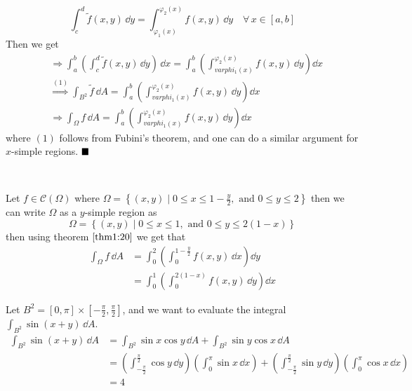 \documentclass[Analysis-3]{subfiles}
\begin{document}
\[
    \int_c^d \tilde{f}(x,y) \, \dd y = \int_{\varphi_1(x)}^{\varphi_2(x)} f(x,y) \, \dd y \quad \forall \, x \in [a,b]    
\]
Then we get 
\begin{align*}
    &\Longrightarrow \int_a^b \left( \int_c^d \tilde{f}(x,y) \, \dd y\right)\, \dd x = \int_a^b \left( \int_{varphi_1(x)}^{\varphi_2(x)} f(x,y) \, \dd y\right) \dd x \\ 
    &\overset{(1)}{\Longrightarrow} \int_{B^2} \tilde{f} \, \dd A = \int_a^b \left( \int_{varphi_1(x)}^{\varphi_2(x)} f(x,y) \, \dd y\right) \dd x \\ 
    &\Longrightarrow \int_{\Omega} f \, \dd A = \int_a^b \left( \int_{varphi_1(x)}^{\varphi_2(x)} f(x,y) \, \dd y\right) \dd x
\end{align*}
where $(1)$ follows from Fubini's theorem, and one can do a similar argument for $x$-simple regions. $\hfill \blacksquare$

\

\begin{Eg}{}{}
    Let $f \in \mathscr{C}(\Omega)$ where $\Omega = \left\{ (x,y) \mid 0 \leq x \leq 1 - \frac{y}{2}, \mbox{ and } 0 \leq y \leq 2 \right\}$ then we can write $\Omega$ as a $y$-simple region as 
    \[
        \Omega = \left\{ (x,y) \mid 0 \leq x \leq 1, \mbox{ and } 0 \leq y \leq 2(1-x) \right\}    
    \]
    then using theorem $\ref{thm1:20}$ we get that 
    \begin{align*}
        \int_{\Omega} f \, \dd A &= \int_0^2 \left( \int_0^{1-\frac{y}{2}} f(x,y) \, \dd x\right) \dd y \\ 
        &= \int_0^1 \left( \int_0^{2(1-x)} f(x,y) \, \dd y\right) \dd x
    \end{align*}
\end{Eg}

\begin{Eg}{}{}
    Let $B^2 = [0,\pi] \times [-\frac{\pi}{2}, \frac{\pi}{2}]$, and we want to evaluate the integral $\int_{B^2} \sin (x+y) \, \dd A$. 
    \begin{align*}
        \int_{B^2}\sin(x+y) \, \dd A &= \int_{B^2} \sin x \cos y \, \dd A + \int_{B^2} \sin y \cos x \, \dd A \\ 
        &= \left( \int_{-\frac{\pi}{2}}^{\frac{\pi}{2}} \cos y \, \dd y\right)\left( \int_{0}^{\pi} \sin x \, \dd x\right) + \left( \int_{-\frac{\pi}{2}}^{\frac{\pi}{2}} \sin y \, \dd y\right)\left( \int_{0}^{\pi} \cos x \, \dd x\right) \\ 
        &= 4 
    \end{align*}
\end{Eg}
\end{document}
